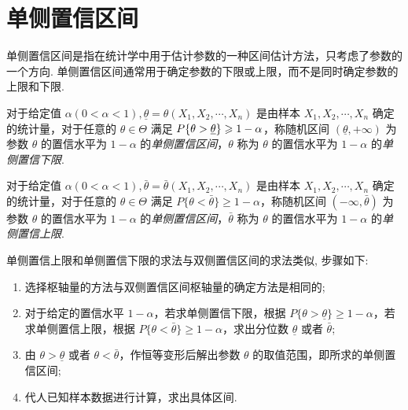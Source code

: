 \section{单侧置信区间}

单侧置信区间是指在统计学中用于估计参数的一种区间估计方法，只考虑了参数的一个方向. 单侧置信区间通常用于确定参数的下限或上限，而不是同时确定参数的上限和下限. 

\begin{definition}[单侧置信下限]
    对于给定值 $ \alpha(0<\alpha<1), \underline{\theta}=\theta\left(X_{1}, X_{2}, \cdots, X_{n}\right) $ 是由样本 $ X_{1}, X_{2}, \cdots, X_{n}$ 确定的统计量，对于任意的 $ \theta \in \Theta $ 满足 $ P\qty{\theta>\underline{\theta}} \geqslant 1-\alpha$，称随机区间 $ (\underline{\theta},+\infty) $ 为参数 $ \theta $ 的置信水平为 $ 1-\alpha $ 的\textit{单侧置信区间}，$ \theta $ 称为 $ \theta $ 的置信水平为 $ 1-\alpha $ 的\textit{单侧置信下限}.
\end{definition}

\begin{definition}[单侧置信上限]
    对于给定值 $ \alpha(0<\alpha<1), \bar{\theta}=\bar{\theta}\left(X_{1}, X_{2}, \cdots, X_{n}\right) $ 是由样本 $ X_{1}, X_{2}, \cdots, X_{n} $ 确定的统计量，对于任意的 $ \theta \in \Theta $ 满足 $ P\{\theta<\bar{\theta}\} \geqslant 1-\alpha$，称随机区间 $ (-\infty, \bar{\theta}) $ 为参数 $ \theta $ 的置信水平为 $ 1-\alpha $ 的\textit{单侧置信区间}，$ \bar{\theta} $ 称为 $ \theta $ 的置信水平为 $ 1-\alpha $ 的\textit{单侧置信上限}.
\end{definition}

单侧置信上限和单侧置信下限的求法与双侧置信区间的求法类似, 步骤如下:
\begin{enumerate}[label=(\arabic{*})]
    \item 选择枢轴量的方法与双侧置信区间枢轴量的确定方法是相同的;
    \item 对于给定的置信水平 $ 1-\alpha $，若求单侧置信下限，根据 $ P\{\theta>\underline{\theta}\} \geqslant 1-\alpha $，若求单侧置信上限，根据 $ P\{\theta<\bar{\theta}\} \geqslant 1-\alpha$，求出分位数 $ \underline{\theta} $ 或者 $ \bar{\theta} $;
    \item 由 $ \theta>\underline{\theta} $ 或者 $ \theta<\bar{\theta} $，作恒等变形后解出参数 $ \theta $ 的取值范围，即所求的单侧置信区间;
    \item 代人已知样本数据进行计算，求出具体区间.
\end{enumerate}

